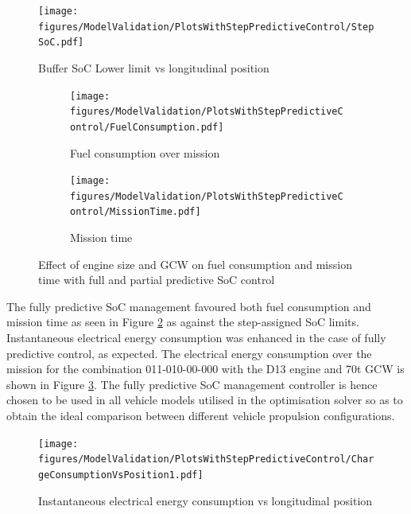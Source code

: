 \documentclass[ExampleMasters.tex]{subfiles}
\begin{document}
\begin{figure}[h!]
\centering
\texttt{[image: figures/ModelValidation/PlotsWithStepPredictiveControl/StepSoC.pdf]}
\caption{Buffer SoC Lower limit vs longitudinal position}
\label{stepSoC}
\end{figure} 

\begin{figure}[h!]
\begin{subfigure}{.5\textwidth}
	\centering
	\texttt{[image: figures/ModelValidation/PlotsWithStepPredictiveControl/FuelConsumption.pdf]}
	\caption{Fuel consumption over mission}
\end{subfigure}
\begin{subfigure}{.5\textwidth}
	\centering
	\texttt{[image: figures/ModelValidation/PlotsWithStepPredictiveControl/MissionTime.pdf]}
	\caption{Mission time}
\end{subfigure}
\caption{Effect of engine size and GCW on fuel consumption and mission time with full and partial predictive SoC control}
\label{timeFuelAxleEngineStepSoC}
\end{figure}

The fully predictive SoC management favoured both fuel consumption and mission time as seen in Figure \ref{timeFuelAxleEngineStepSoC} as against the step-assigned SoC limits. Instantaneous electrical energy consumption was enhanced in the case of fully predictive control, as expected. The electrical energy consumption over the mission for the combination 011-010-00-000 with the D13 engine and 70t GCW is shown in Figure \ref{electricalEnergyConsumptionStepSoC}. The fully predictive SoC management controller is hence chosen to be used in all vehicle models utilised in the optimisation solver so as to obtain the ideal comparison between different vehicle propulsion configurations.\\

\begin{figure}[h!]
\centering
\texttt{[image: figures/ModelValidation/PlotsWithStepPredictiveControl/ChargeConsumptionVsPosition1.pdf]}
\caption{Instantaneous electrical energy consumption vs longitudinal position}
\label{electricalEnergyConsumptionStepSoC}
\end{figure} 
\end{document}
